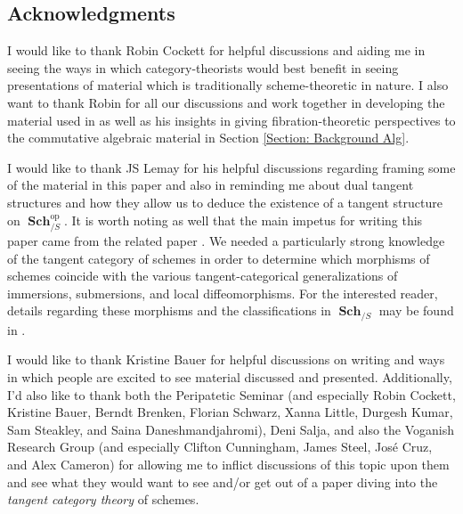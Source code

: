 \documentclass{amsart}
\theoremstyle{definition}
\DeclareMathOperator{\op}{op}
\DeclareMathOperator{\Sch}{\mathbf{Sch}}
\numberwithin{equation}{subsection}
\begin{document}
\subsection*{Acknowledgments}

I would like to thank Robin Cockett for helpful discussions and aiding me in seeing the ways in which category-theorists would best benefit in seeing presentations of material which is traditionally scheme-theoretic in nature. I also want to thank Robin for all our discussions and work together in developing the material used in \cite{RobinMePartialMapRigs} as well as his insights in giving fibration-theoretic perspectives to the commutative algebraic material in Section \ref{Section: Background Alg}.

I would like to thank JS Lemay for his helpful discussions regarding framing some of the material in this paper and also in reminding me about dual tangent structures and how they allow us to deduce the existence of a tangent structure on $\Sch_{/S}^{\op}$. It is worth noting as well that the main impetus for writing this paper came from the related paper \cite{JSMeMapFlavoursInTanCats}. We needed a particularly strong knowledge of the tangent category of schemes in order to determine which morphisms of schemes coincide with the various tangent-categorical generalizations of immersions, submersions, and local diffeomorphisms. For the interested reader, details regarding these morphisms and the classifications in $\Sch_{/S}$ may be found in \cite[Sections 6 -- 10]{JSMeMapFlavoursInTanCats}.

I would like to thank Kristine Bauer for helpful discussions on writing and ways in which people are excited to see material discussed and presented. Additionally, I'd also like to thank both the Peripatetic Seminar (and especially Robin Cockett, Kristine Bauer, Berndt Brenken, Florian Schwarz, Xanna Little, Durgesh Kumar, Sam Steakley, and Saina Daneshmandjahromi), Deni Salja, and also the Voganish Research Group (and especially Clifton Cunningham, James Steel, Jos{\'e} Cruz, and Alex Cameron) for allowing me to inflict discussions of this topic upon them and see what they would  want to see and/or get out of a paper diving into the \emph{tangent category theory} of schemes.

\end{document}
